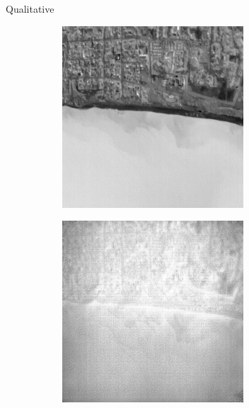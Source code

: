 \begin{frame}{Qualitative}
\begin{figure}
        \begin{subfigure}[b]{0.24\textwidth}
            \centering
            \includegraphics[width=\textwidth]{../figs/outputs/pan/28.png}
            \label{fig:pan}
        \end{subfigure}
        \hfill
        \begin{subfigure}[b]{0.24\textwidth}
            \centering
            \includegraphics[width=\textwidth]{../figs/outputs/cut/28.png}

\end{subfigure}
\end{figure}
\end{frame}
